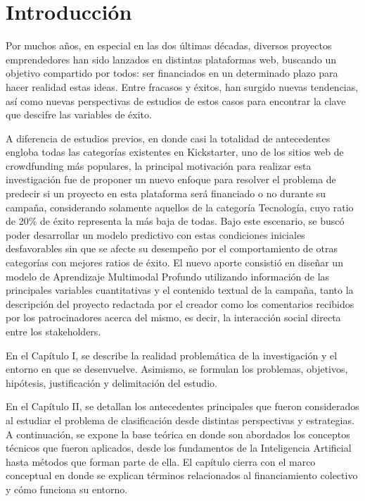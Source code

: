 
\chapter*{Introducción}

Por muchos años, en especial en las dos últimas décadas, diversos proyectos emprendedores han sido lanzados en distintas plataformas web, buscando un objetivo compartido por todos: ser financiados en un determinado plazo para hacer realidad estas ideas. Entre fracasos y éxitos, han surgido nuevas tendencias, así como nuevas perspectivas de estudios de estos casos para encontrar la clave que descifre las variables de éxito.

A diferencia de estudios previos, en donde casi la totalidad de antecedentes engloba todas las categorías existentes en Kickstarter, uno de los sitios web de crowdfunding más populares, la principal motivación para realizar esta investigación fue de proponer un nuevo enfoque para resolver el problema de predecir si un proyecto en esta plataforma será financiado o no durante su campaña, considerando solamente aquellos de la categoría Tecnología, cuyo ratio de 20\% de éxito representa la más baja de todas. Bajo este escenario, se buscó poder desarrollar un modelo predictivo con estas condiciones iniciales desfavorables sin que se afecte su desempeño por el comportamiento de otras categorías con mejores ratios de éxito. El nuevo aporte consistió en diseñar un modelo de Aprendizaje Multimodal Profundo utilizando información de las principales variables cuantitativas y el contenido textual de la campaña, tanto la descripción del proyecto redactada por el creador como los comentarios recibidos por los patrocinadores acerca del mismo, es decir, la interacción social directa entre los stakeholders.

En el Capítulo I, se describe la realidad problemática de la investigación y el entorno en que se desenvuelve. Asimismo, se formulan los problemas, objetivos, hipótesis, justificación y delimitación del estudio.

En el Capítulo II, se detallan los antecedentes principales que fueron considerados al estudiar el problema de clasificación desde distintas perspectivas y estrategias. A continuación, se expone la base teórica en donde son abordados los conceptos técnicos que fueron aplicados, desde los fundamentos de la Inteligencia Artificial hasta métodos que forman parte de ella. El capítulo cierra con el marco conceptual en donde se explican términos relacionados al financiamiento colectivo y cómo funciona su entorno.

